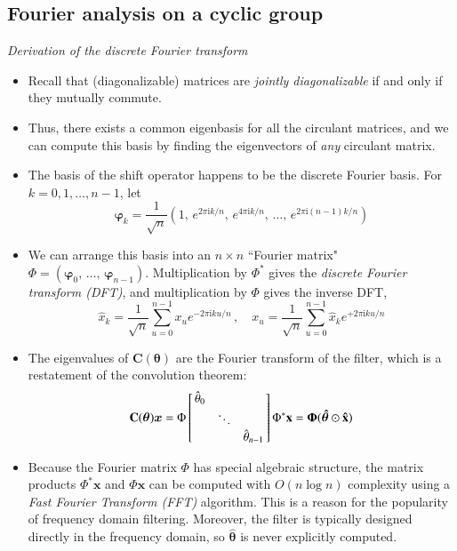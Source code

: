 \documentclass[12pt]{article}
\numberwithin{equation}{section}
\theoremstyle{definition}
\newcommand{		\rmi		}	{	\textrm{i}					}
\newcommand{		\n		}	{	\noindent					} %
\newcommand{		\1		}	{	\bm{1}					}%
\begin{document}
\subsection{Fourier analysis on a cyclic group} 

\n\hrulefill 
\emph{ Derivation of the discrete Fourier transform }
\hrulefill

\begin{itemize}
\item Recall that (diagonalizable) matrices are \emph{jointly diagonalizable} if and only if they mutually commute. 
\item Thus, there exists a common eigenbasis for all the circulant matrices, and we can compute this basis by finding the eigenvectors of \emph{any} circulant matrix.
\item The basis of the shift operator happens to be the discrete Fourier basis. For $k = 0,1, \dots, n-1$, let 
$$
\bm{\varphi}_k = \frac{1}{\sqrt{n}} \left( 1, \,e^{2\pi \rmi k / n}, \, e^{4\pi \rmi k / n},\, \dots, \, e^{2\pi \rmi (n-1)k / n} \right)
$$
\item We can arrange this basis into an $n \times n$ ``Fourier matrix" $\Phi = ( \bm{\varphi}_0, \, \dots, \, \bm{\varphi}_{n-1} )$. Multiplication by $\Phi^*$ gives the \emph{discrete Fourier transform (DFT)}, and multiplication by $\Phi$ gives the inverse DFT, 
$$
\hat{x}_k = \frac{1}{\sqrt{n}} \sum_{u = 0}^{n-1} x_u e^{ - 2\pi \rmi ku /n }\,, \quad x_u = \frac{1}{\sqrt{n}} \sum_{u = 0}^{n-1} \hat{x}_k e^{+ 2\pi \rmi ku / n} 
$$
\item The eigenvalues of $\mathbf{C}(\bm{\theta})$ are the Fourier transform of the filter, which is a restatement of the convolution theorem:
$$
\mathbf{C}(\bm{\theta}) \bm{x} 
= \Phi \left[ 
\begin{matrix}\,
\hat{\theta}_0 & \text{ } & \text{ } \\
\text{ } &\ddots &  \text{ } \\
\text{ } & \text{ } & \hat{\theta}_{n-1} 
\,\end{matrix}
\right]
\Phi ^* \bf{x} = \Phi ( \hat{\bm{\theta}} \odot \hat{\bm{x}} )
$$
\item Because the Fourier matrix $\Phi$ has special algebraic structure, the matrix products $\Phi^* \bm{x}$ and $\Phi \bm{x}$ can be computed with $O( n \log n)$ complexity using a \emph{Fast Fourier Transform (FFT)} algorithm. This is a reason for the popularity of frequency domain filtering. Moreover, the filter is typically designed directly in the frequency domain, so $\hat{\bm{\theta}}$ is never explicitly computed. 
\end{itemize}
\end{document}
